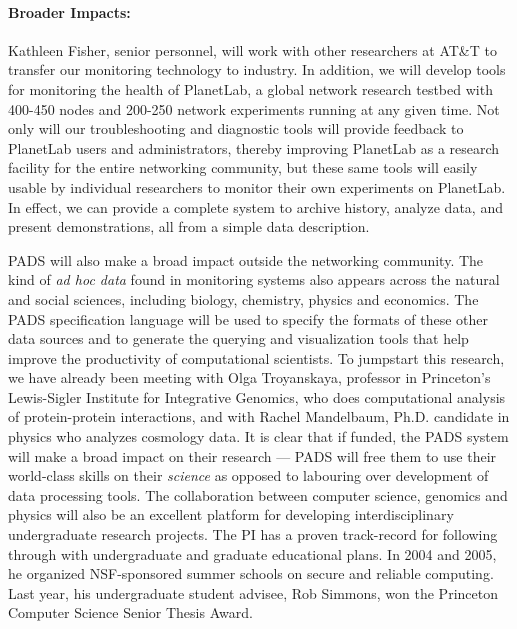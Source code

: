 \paragraph*{Broader Impacts:}  Kathleen Fisher, senior personnel, 
will work with other researchers at AT\&T to transfer our monitoring
technology to industry.  In addition, we will develop tools for
monitoring the health of PlanetLab, a global network research testbed
with 400-450 nodes and 200-250 network experiments running at any
given time.  Not only will our troubleshooting and diagnostic tools
will provide feedback to PlanetLab users and administrators, thereby
improving PlanetLab as a research facility for the entire networking
community, but these same tools will easily usable by individual
researchers to monitor their own experiments on PlanetLab. In effect,
we can provide a complete system to archive history, analyze data, and
present demonstrations, all from a simple data description.

PADS will also make a broad impact outside the networking community.
The kind of {\em ad hoc data} found in monitoring systems also appears
across the natural and social sciences, including biology, chemistry,
physics and economics.  The PADS specification language will be used to
specify the formats of these other data sources and to generate the
querying and visualization tools that help improve
the productivity of computational scientists.  To jumpstart this
research, we have already been meeting with Olga Troyanskaya,
professor in Princeton's Lewis-Sigler Institute for Integrative
Genomics, who does computational analysis of protein-protein
interactions, and with Rachel Mandelbaum, Ph.D. candidate in physics
who analyzes cosmology data.  It is clear that if funded, the PADS system
will make a broad impact on their research --- PADS will free them to use
their world-class skills on their {\em science} 
as opposed to labouring over development of data processing tools.
The collaboration between computer science, genomics and physics will
also be an excellent platform for developing interdisciplinary
undergraduate research projects.  The PI has a proven track-record for
following through with undergraduate and graduate educational plans.
In 2004 and 2005, he organized NSF-sponsored summer schools on secure
and reliable computing.  Last year, his undergraduate student advisee,
Rob Simmons, won the Princeton Computer Science Senior Thesis Award.

